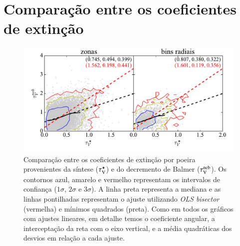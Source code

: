 
\section{Comparação entre os coeficientes de extinção}
\label{apendice:synvsneb:tauv}

\begin{figure}
	\centering
	\includegraphics[width=0.99\textwidth]{figuras/CompareTauV_realsample.pdf}
	\caption[Comparação entre os coeficientes de extinção]
	{Comparação entre os coeficientes de extinção por poeira provenientes da síntese ($\tau_{\mathrm{V}}^\star$) e do decremento de Balmer ($\tau_{\mathrm{V}}^{\mathrm{neb}}$). Os contornos azul, amarelo e vermelho representam os intervalos de confiança ($1\sigma$, $2\sigma$ e $3\sigma$). A linha preta representa a mediana e as linhas pontilhadas representam o ajuste utilizando {\em OLS bisector} (vermelha) e mínimos quadrados (preta). Como em todos os gráficos com ajustes lineares, em detalhe temos o coeficiente angular, a interceptação da reta com o eixo vertical, e a média quadráticas dos desvios em relação a cada ajuste.}
	\label{fig:tauVsynvsneb}
\end{figure}


